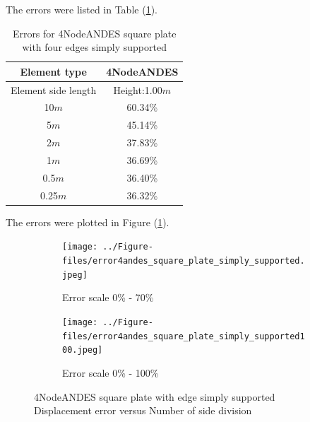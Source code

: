 \documentclass[fleqn,11pt]{article}
\begin{document}
The errors were listed in Table (\ref{table Errors for 4NodeANDES square plate with four edges simply supported}).

\begin{table}[H]
  \centering
  \caption{Errors for 4NodeANDES square plate with four edges simply supported}
  \label{table Errors for 4NodeANDES square plate with four edges simply supported}
\begin{tabular}{|c|c|}
\hline
Element type     & 4NodeANDES          \\ \hline
Element side length & Height:1.00$m$   \\ \hline
10$m$            & 60.34\%        \\ \hline
5$m$             & 45.14\%        \\ \hline
2$m$             & 37.83\%        \\ \hline
1$m$             & 36.69\%        \\ \hline
0.5$m$           & 36.40\%        \\ \hline
0.25$m$          & 36.32\%       \\
\hline
\end{tabular}
\end{table}



The errors were plotted in Figure (\ref{fig 4NodeANDES square plate with four edge simply supported}).
\begin{figure}[H]
  \begin{subfigure}{0.5\textwidth}
    \centering
    \texttt{[image: ../Figure-files/error4andes\_square\_plate\_simply\_supported.jpeg]}
    \caption{Error scale 0\% - 70\%}
  \end{subfigure}
  \begin{subfigure}{0.5\textwidth}
    \centering
    \texttt{[image: ../Figure-files/error4andes\_square\_plate\_simply\_supported100.jpeg]}
    \caption{Error scale 0\% - 100\%}
  \end{subfigure}
  \captionsetup{justification=centering,margin=2cm}
  \caption{4NodeANDES square plate with edge simply supported\\
      Displacement error   versus   Number of side division}
  \label{fig 4NodeANDES square plate with four edge simply supported}
\end{figure}
\end{document}
